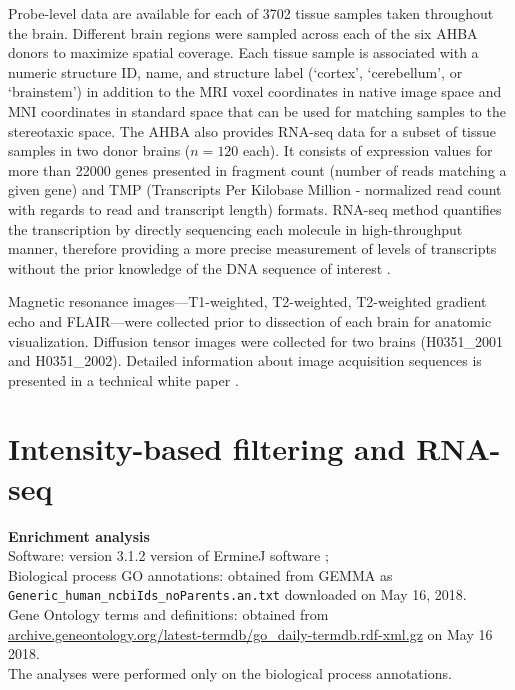 Probe-level data are available for each of \num{3702} tissue samples taken throughout the brain. Different brain regions were sampled across each of the six AHBA donors to maximize spatial coverage. Each tissue sample is associated with a numeric structure ID, name, and structure label (`cortex', `cerebellum', or `brainstem') in addition to the MRI voxel coordinates in native image space and MNI coordinates in standard space that can be used for matching samples to the stereotaxic space. The AHBA also provides RNA-seq data for a subset of tissue samples in two donor brains ($n=120$ each). It consists of expression values for more than \num{22000} genes presented in fragment count (number of reads matching a given gene) and TMP (Transcripts Per Kilobase Million - normalized read count with regards to read and transcript length) formats. RNA-seq method quantifies the transcription by directly sequencing each molecule in high-throughput manner, therefore providing a more precise measurement of levels of transcripts without the prior knowledge of the DNA sequence of interest \citep{Wang2009}.

Magnetic resonance images---T1-weighted, T2-weighted, T2-weighted gradient echo and FLAIR---were collected prior to dissection of each brain for anatomic visualization. Diffusion tensor images were collected for two brains (H0351\_2001 and H0351\_2002). Detailed information about image acquisition sequences is presented in a technical white paper \citep{AHBAdoc}.


\section{Intensity-based filtering and RNA-seq}
\label{app:AppendixCh4_2}

\textbf{Enrichment analysis} \\
\noindent Software: version 3.1.2 version of ErmineJ software \citep{Gillis2010};\\
Biological process GO annotations: obtained from GEMMA \citep{Zoubarev2012} as \\
\texttt{Generic\_human\_ncbiIds\_noParents.an.txt} downloaded on May 16, 2018. \\
Gene Ontology terms and definitions: obtained from \url{archive.geneontology.org/latest-termdb/go_daily-termdb.rdf-xml.gz} on May 16 2018.\\
The analyses were performed only on the biological process annotations. \\

